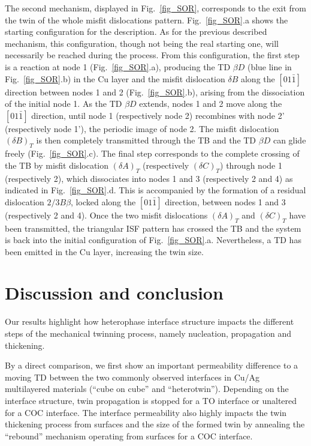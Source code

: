 \documentclass[final,3p,times,twocolumn]{elsarticle}
\begin{document}
The second mechanism, displayed in Fig.~\ref{fig_SOR}, corresponds to the exit from the twin of the whole misfit dislocations pattern. Fig.~\ref{fig_SOR}.a shows the starting configuration for the description. As for the previous described mechanism, this configuration, though not being the real starting one, will necessarily be reached during the process. From this configuration, the first step is a reaction at node 1 (Fig.~\ref{fig_SOR}.a), producing the TD $\beta D$ (blue line in Fig.~\ref{fig_SOR}.b) in the Cu layer and the misfit dislocation $\delta B$ along the $\left[ 01\bar{1} \right]$ direction between nodes 1 and 2 (Fig.~\ref{fig_SOR}.b), arising from the dissociation of the initial node 1. As the TD $\beta D$ extends, nodes 1 and 2 move along the $\left[ 01\bar{1} \right]$ direction, until node 1 (respectively node 2) recombines with node 2' (respectively node 1'), the periodic image of node 2. The misfit dislocation $(\delta B)_{T}$ is then completely transmitted through the TB and the TD $\beta D$ can glide freely (Fig.~\ref{fig_SOR}.c). The final step corresponds to the complete crossing of the TB by misfit dislocation $(\delta A)_{T}$ (respectively $(\delta C)_{T}$) through node 1 (respectively 2), which dissociates into nodes 1 and 3 (respectively 2 and 4) as indicated in Fig.~\ref{fig_SOR}.d. This is accompanied by the formation of a residual dislocation $2/3 B\beta$, locked along the $\left[ 01\bar{1} \right]$ direction, between nodes 1 and 3 (respectively 2 and 4). Once the two misfit dislocations $(\delta A)_{T}$ and $(\delta C)_{T}$ have been transmitted, the triangular ISF pattern has crossed the TB and the system is back into the initial configuration of Fig.~\ref{fig_SOR}.a. Nevertheless, a TD has been emitted in the Cu layer, increasing the twin size.

\section{Discussion and conclusion}
\label{part_conclusion}

Our results highlight how heterophase interface structure impacts the different steps of the mechanical twinning process, namely nucleation, propagation and thickening. 

By a direct comparison, we first show an important permeability difference to a moving TD between the two commonly observed interfaces in Cu/Ag multilayered materials (``cube on cube'' and ``heterotwin''). Depending on the interface structure, twin propagation is stopped for a TO interface or unaltered for a COC interface. The interface permeability also highly impacts the twin thickening process from surfaces and the size of the formed twin by annealing the ``rebound'' mechanism operating from surfaces for a COC interface. 
\end{document}
